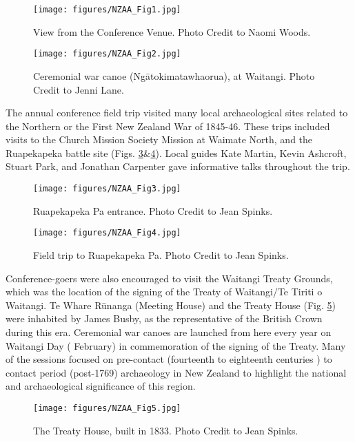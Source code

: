 	\begin{figure}
		\texttt{[image: figures/NZAA\_Fig1.jpg]}
		\centering
		\caption{View from the Conference Venue. Photo Credit to Naomi Woods.}
		\label{fig:NZAA_Fig1}
	\end{figure}
	\begin{figure}
		\texttt{[image: figures/NZAA\_Fig2.jpg]}
		\centering
		\caption{Ceremonial war canoe (Ngātokimatawhaorua), at Waitangi. Photo Credit to Jenni Lane.}
		\label{fig:NZAA_Fig2}
	\end{figure}
	
The annual conference field trip visited many local archaeological sites related to the Northern or the First New Zealand War of 1845-46. These trips included visits to the Church Mission Society Mission at Waimate North, and the Ruapekapeka battle site (Figs. \ref{fig:NZAA_Fig3}\&\ref{fig:NZAA_Fig4}). Local guides Kate Martin, Kevin Ashcroft, Stuart Park, and Jonathan Carpenter gave informative talks throughout the trip.

	\begin{figure}
		\texttt{[image: figures/NZAA\_Fig3.jpg]}
		\centering
		\caption{Ruapekapeka Pa entrance. Photo Credit to Jean Spinks.}
		\label{fig:NZAA_Fig3}
	\end{figure}
	\begin{figure}
		\texttt{[image: figures/NZAA\_Fig4.jpg]}
		\centering
		\caption{Field trip to Ruapekapeka Pa. Photo Credit to Jean Spinks.}
		\label{fig:NZAA_Fig4}
	\end{figure}
	
Conference-goers were also encouraged to visit the Waitangi Treaty Grounds, which was the location of the signing of the Treaty of Waitangi/Te Tiriti o Waitangi. Te Whare Rūnanga (Meeting House) and the Treaty House (Fig. \ref{fig:NZAA_Fig5}) were inhabited by James Busby, as the representative of the British Crown during this era. Ceremonial war canoes are launched from here every year on Waitangi Day ( February) in commemoration of the signing of the Treaty. Many of the sessions focused on pre-contact (fourteenth to eighteenth centuries \AD) to contact period (post-1769) archaeology in New Zealand to highlight the national and archaeological significance of this region.

	\begin{figure}
		\texttt{[image: figures/NZAA\_Fig5.jpg]}
		\centering
		\caption{The Treaty House, built in 1833. Photo Credit to Jean Spinks.}
		\label{fig:NZAA_Fig5}
	\end{figure}


